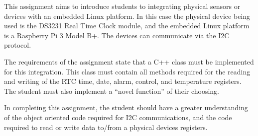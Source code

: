 This assignment aims to introduce students to integrating physical sensors or
devices with an embedded Linux platform. In this case the physical device being
used is the DS3231 Real Time Clock module, and the embedded Linux platform is a
Raspberry Pi 3 Model B+. The devices can communicate via the I2C protocol.

The requirements of the assignment state that a C++ class must be implemented
for this integration. This class must contain all methods required for the reading
and writing of the RTC time, date, alarm, control, and temperature registers.
The student must also implement a ``novel function'' of their choosing.

In completing this assignment, the student should have a greater understanding
of the object oriented code required for I2C communications, and the code
required to read or write data to/from a physical devices registers.
